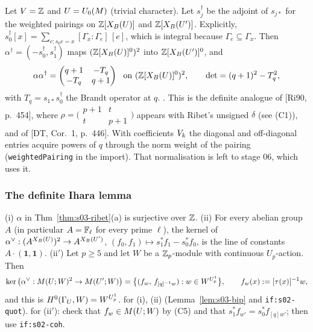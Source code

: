 \begin{proposition}\label{prop:s03-LRdef}
Let $V=\mathbb{Z}$ and $U=U_0(M)$ (trivial character). Let $s_j^\dagger$ be the adjoint of $s_{j*}$ for the weighted pairings on
$\mathbb{Z}[X_B(U)]$ and $\mathbb{Z}[X_B(U')]$. Explicitly, $s_0^\dagger[x]=\sum_{e:s_0e=x}[\Gamma_x:\Gamma_e]\,[e]$, which is integral because
$\Gamma_e\subseteq\Gamma_x$. Then $\alpha^\dagger=(-s_0^\dagger,s_1^\dagger)$ maps $(\mathbb{Z}[X_B(U)]^0)^2$ into $\mathbb{Z}[X_B(U')]^0$, and
\[\alpha\alpha^\dagger=\begin{pmatrix}q+1&-T_q\\-T_q&q+1\end{pmatrix}\ \text{ on }(\Z[\XB U]^0)^2,\qquad
\det=(q+1)^2-T_q^2,\]
with $T_q=s_{1*}s_0^\dagger$ the Brandt operator at $q$. \sttoprove{}. This is the definite analogue of [Ri90, p.~454], where
$\rho=\big(\begin{smallmatrix}p+1&t\\t&p+1\end{smallmatrix}\big)$ appears with Ribet's unsigned $\delta$ (see (C1)), and of [DT,
Cor.~1, p.~446]. With coefficients $V_k$ the diagonal and off-diagonal entries acquire powers of $q$ through the norm weight of the
pairing (\texttt{weightedPairing} in the import). That normalisation is left to stage 06, which uses it.
\end{proposition}

\subsubsection{The definite Ihara lemma}
\begin{corollary}\label{cor:s03-ihara}
(i) $\alpha$ in Thm~\ref{thm:s03-ribet}(a) is surjective over $\mathbb{Z}$.
(ii) For every abelian group $A$ (in particular $A=\mathbb{F}_\ell$ for every prime $\ell$), the kernel of
$\alpha^\vee:(A^{X_B(U)})^2\to A^{X_B(U')}$, $(f_0,f_1)\mapsto s_1^*f_1-s_0^*f_0$, is the line of constants $A\cdot(\mathbf1,\mathbf1)$.
(ii$'$) Let $p\ge5$ and let $W$ be a $\mathbb{Z}_p$-module with continuous $U_p$-action. Then
\[\ker\big(\alpha^\vee:M(U;W)^2\to M(U';W)\big)=\big\{(f_w,\,f_{[q]^{-1}w}):w\in W^{U^1_p}\big\},\qquad f_w(x):=[\tau(x)]^{-1}w,\]
and this is $H^0(\Gamma_U,W)=W^{U^1_p}$.
\stproved{} for (i), (ii) (Lemma~\ref{lem:s03-bip} and \texttt{if:s02-quot}). \sttoprove{} for (ii$'$): check that $f_w\in M(U;W)$
by (C5) and that $s_1^*f_{w'}=s_0^*f_{[q]w'}$; then use \texttt{if:s02-coh}.
\end{corollary}

